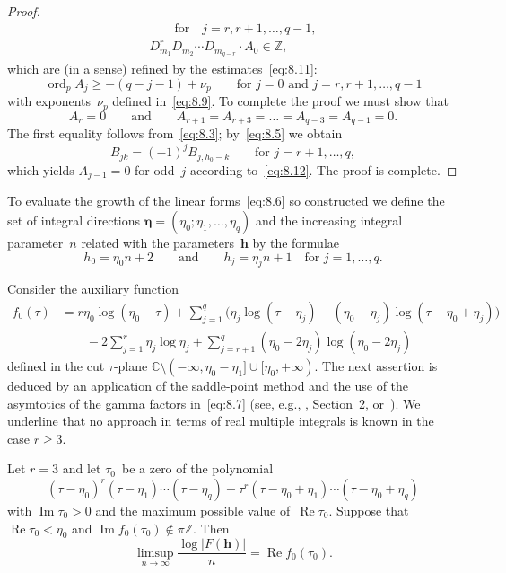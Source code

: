 \documentclass[a4paper,twoside]{article}
\numberwithin{equation}{section}
\renewcommand{\[}{\lfloor}
\renewcommand{\]}{\rfloor}
\newcommand{\<}{\langle}
\renewcommand{\>}{\rangle}
\DeclareMathOperator{\ord}{ord}
\DeclareMathOperator{\Real}{Re}
\renewcommand{\Re}{\Real}
\DeclareMathOperator{\Imag}{Im}
\renewcommand{\Im}{\Imag}
\newcommand{\bh}{\boldsymbol h}
\newcommand{\Beta}{\boldsymbol\eta}
\begin{document}
\begin{proof}
\begin{gather*}
\qquad\mbox{for}\quad j=r,r+1,\dots,q-1,
\\
D_{m_1}^rD_{m_2}\dotsb D_{m_{q-r}}
\cdot A_0\in\mathbb Z,
\end{gather*}
which are (in a sense) refined by the estimates~\eqref{eq:8.11}:
$$
\ord_pA_j\ge-(q-j-1)+\nu_p
\qquad\mbox{for $j=0$ and $j=r,r+1,\dots,q-1$}
$$
with exponents~$\nu_p$ defined in~\eqref{eq:8.9}.
To complete the proof we must show that
$$
A_r=0 \qquad\mbox{and}\qquad
A_{r+1}=A_{r+3}=\dots=A_{q-3}=A_{q-1}=0.
$$
The first equality follows from~\eqref{eq:8.3};
by~\eqref{eq:8.5} we obtain
$$
B_{jk}=(-1)^jB_{j,h_0-k}
\qquad\mbox{for $j=r+1,\dots,q$},
$$
which yields $A_{j-1}=0$ for odd~$j$ according to~\eqref{eq:8.12}.
The proof is complete.
\end{proof}

To evaluate the growth of the linear forms~\eqref{eq:8.6}
so constructed we define the set of integral directions
$\Beta=(\eta_0;\eta_1,\dots,\eta_q)$ and the increasing
integral parameter~$n$
related with the parameters~$\bh$ by the formulae
\begin{equation}
h_0=\eta_0n+2 \qquad\mbox{and}\qquad
h_j=\eta_jn+1 \quad\mbox{for $j=1,\dots,q$}.
\label{eq:8.13}
\end{equation}

Consider the auxiliary function
\begin{align*}
f_0(\tau)
&=r\eta_0\log(\eta_0-\tau)
+\sum_{j=1}^q\bigl(\eta_j\log(\tau-\eta_j)
-(\eta_0-\eta_j)\log(\tau-\eta_0+\eta_j)\bigr)
\\ &\qquad
-2\sum_{j=1}^r\eta_j\log\eta_j
+\sum_{j=r+1}^q(\eta_0-2\eta_j)\log(\eta_0-2\eta_j)
\end{align*}
defined in the cut $\tau$-plane
$\mathbb C\setminus(-\infty,\eta_0-\eta_1]\cup[\eta_0,+\infty)$.
The next assertion is deduced by an application of
the saddle-point method and the use of the asymtotics
of the gamma factors in~\eqref{eq:8.7}
(see, e.g., \cite{Zu3}, Section~2, or~\cite{Ri4}).
We underline that no approach in terms
of real multiple integrals is known in the case $r\ge3$.

\begin{lemma}
\label{lem:20}
Let $r=3$ and let $\tau_0$~be a zero of the polynomial
$$
(\tau-\eta_0)^r(\tau-\eta_1)\dotsb(\tau-\eta_q)
-\tau^r(\tau-\eta_0+\eta_1)\dotsb(\tau-\eta_0+\eta_q)
$$
with $\Im\tau_0>0$ and the maximum possible value of~$\Re\tau_0$.
Suppose that $\Re\tau_0<\eta_0$ and
$\Im f_0(\tau_0)\notin\pi\mathbb Z$. Then
$$
\limsup_{n\to\infty}\frac{\log|F(\bh)|}n=\Re f_0(\tau_0).
$$
\end{lemma}
\end{document}
